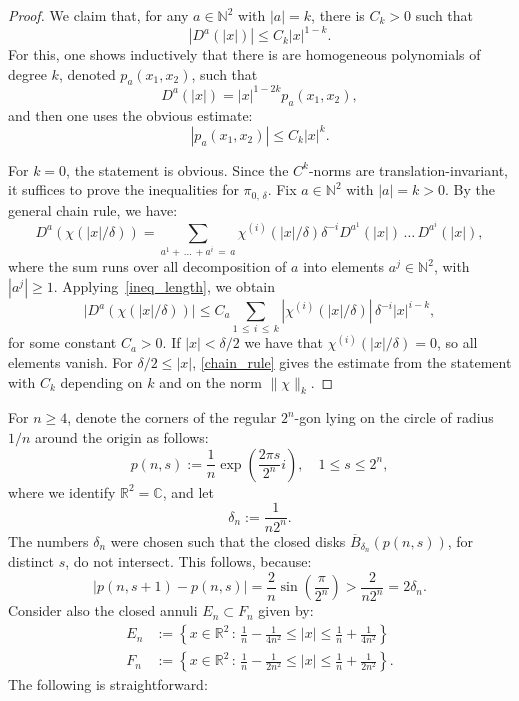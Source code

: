 \documentclass[AHL,Unicode,published]{cedram}
\newcommand{\R}{\mathbb{R}}
\newcommand{\N}{\mathbb{N}}
\newcommand{\norm}[1]{\|#1\|}
\newcommand{\bbC}{\mathbb{C}}
\begin{document}
\begin{proof}
We claim that, for any $a\in \N^2$ with $|a|=k$, there is $C_k>0$ such that
\begin{equation}\label{ineq_length}
\left|D^a(|x|)\right|\leq C_k|x|^{1-k}.
\end{equation}
For this, one shows inductively that there is are homogeneous polynomials of degree $k$, denoted $p_a(x_1,x_2)$, such that
\[
D^a(|x|)=|x|^{1-2k}p_a(x_1,x_2),
\]
and then one uses the obvious estimate:
\[
|p_a(x_1,x_2)|\leq C_k|x|^k.
\]

For $k=0$, the statement is obvious. Since the $C^k$-norms are translation-invariant, it suffices to prove the inequalities for $\pi_{0,\,\delta}$. Fix $a\in \N^2$ with $|a|=k>0$. By the general chain rule, we have:
\[
D^a\left(\chi(|x|/\delta)\right)=\sum_{a^1+\,\ldots\,+a^i\,=\,a}\chi^{(i)}\left(|x|/\delta\right)\delta^{-i} D^{a^1}(|x|)\,\ldots\,D^{a^i}(|x|),
\]
where the sum runs over all decomposition of $a$ into elements $a^j\in \N^2$, with $|a^j|\geq 1$. Applying~\eqref{ineq_length}, we obtain
\begin{equation}\label{chain_rule}
\big|D^a\left(\chi(|x|/\delta)\right)\big|\leq C_a\sum_{1\,\leq\,i\,\leq\,k}\left|\chi^{(i)}(|x|/\delta)\right|\,\delta^{-i} |x|^{i-k},
\end{equation}
for some constant $C_a>0$. If $|x|<\delta/2$ we have that $\chi^{(i)}(|x|/\delta)=0$, so all elements vanish. For $\delta/2\leq |x|$, \eqref{chain_rule} gives the estimate from the statement with $C_k$ depending on $k$ and on the norm $\norm{\chi}_k$.
\end{proof}

For $n\geq 4$, denote the corners of the regular $2^n$-gon lying on the circle of radius $1/n$ around the origin as follows:
\[
p(n,s):=\frac{1}{n}\exp\left(\frac{2 \pi s }{2^{n}}i\right), \quad 1\leq s\leq 2^n,
\]
where we identify $\R^2=\bbC$, and let
\[
\delta_n:=\frac{1}{n 2^n}.
\]
The numbers $\delta_n$ were chosen such that the closed disks $\overline{B}_{\delta_n}(p(n,s))$, for distinct $s$, do not intersect. This follows, because:
\[
\big|p(n,s+1)-p(n,s)\big|=\frac{2}{n}\sin\left(\frac{\pi}{2^n}\right)>\frac{2}{n2^n}=2\delta_n.
\]
Consider also the closed annuli $E_n\subset F_n$ given by:
\begin{align*}
E_n&:=\left\{x\in \R^2\, :\, \frac{1}{n}-\frac{1}{4n^2}\leq |x|\leq \frac{1}{n}+\frac{1}{4n^2}\right\}\\
F_n&:=\left\{x\in \R^2\, :\, \frac{1}{n}-\frac{1}{2n^2}\leq |x|\leq \frac{1}{n}+\frac{1}{2n^2}\right\}.
\end{align*}
The following is straightforward:
\end{document}
